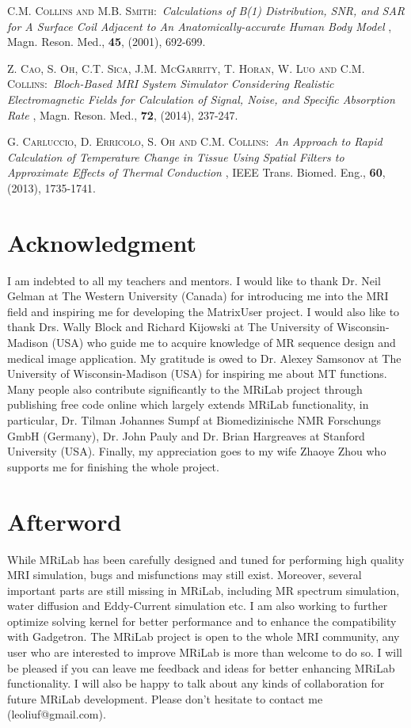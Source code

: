 \documentclass{book}%
\begin{document}
\begin{thebibliography}{9}
 \textsc{C.M. Collins and M.B. Smith}:\
\textit{Calculations of B(1) Distribution, SNR, and SAR for A Surface Coil Adjacent to An Anatomically-accurate Human Body Model}
, Magn. Reson. Med., \textbf{45}, (2001), 692-699.

 \textsc{Z. Cao, S. Oh, C.T. Sica, J.M. McGarrity, T. Horan, W. Luo and C.M. Collins}:\
\textit{Bloch-Based MRI System Simulator Considering Realistic Electromagnetic Fields for Calculation of Signal, Noise, and Specific Absorption Rate}
, Magn. Reson. Med., \textbf{72}, (2014), 237-247.

 \textsc{G. Carluccio, D. Erricolo, S. Oh and C.M. Collins}:\
\textit{An Approach to Rapid Calculation of Temperature Change in Tissue Using Spatial Filters to Approximate Effects of Thermal Conduction}
, IEEE Trans. Biomed. Eng., \textbf{60}, (2013), 1735-1741.

\end{thebibliography}

\backmatter

\chapter{Acknowledgment}

I am indebted to all my teachers and mentors. I would like to thank Dr. Neil Gelman at The Western University (Canada) for introducing me into the MRI field and inspiring me for developing the MatrixUser project. I would also like to thank Drs. Wally Block and Richard Kijowski at The University of Wisconsin-Madison (USA) who guide me to acquire knowledge of MR sequence design and medical image application. My gratitude is owed to Dr. Alexey Samsonov at The University of Wisconsin-Madison (USA) for inspiring me about MT functions. Many people also contribute significantly to the MRiLab project through publishing free code online which largely extends MRiLab functionality, in particular, Dr. Tilman Johannes Sumpf at Biomedizinische NMR Forschungs GmbH (Germany), Dr. John Pauly and Dr. Brian Hargreaves at Stanford University (USA). Finally, my appreciation goes to my wife Zhaoye Zhou who supports me for finishing the whole project.

\chapter{Afterword}

While MRiLab has been carefully designed and tuned for performing high quality MRI simulation, bugs and misfunctions may still exist. Moreover, several important parts are still missing in MRiLab, including MR spectrum simulation, water diffusion and Eddy-Current simulation etc. I am also working to further optimize solving kernel for better performance and to enhance the compatibility with Gadgetron. The MRiLab project is open to the whole MRI community, any user who are interested to improve MRiLab is more than welcome to do so. I will be pleased if you can leave me feedback and ideas for better enhancing MRiLab functionality. I will also be happy to talk about any kinds of collaboration for future MRiLab development. Please don't hesitate to contact me (leoliuf@gmail.com).
\end{document}
